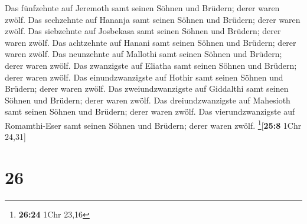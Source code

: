  Das fünfzehnte auf Jeremoth samt seinen Söhnen und
Brüdern; derer waren zwölf.  Das sechzehnte auf Hananja
samt seinen Söhnen und Brüdern; derer waren zwölf.  Das
siebzehnte auf Josbekasa samt seinen Söhnen und Brüdern; derer waren
zwölf.  Das achtzehnte auf Hanani samt seinen Söhnen und
Brüdern; derer waren zwölf.  Das neunzehnte auf Mallothi
samt seinen Söhnen und Brüdern; derer waren zwölf.  Das
zwanzigste auf Eliatha samt seinen Söhnen und Brüdern; derer waren
zwölf.  Das einundzwanzigste auf Hothir samt seinen
Söhnen und Brüdern; derer waren zwölf.  Das
zweiundzwanzigste auf Giddalthi samt seinen Söhnen und Brüdern; derer
waren zwölf.  Das dreiundzwanzigste auf Mahesioth samt
seinen Söhnen und Brüdern; derer waren zwölf.  Das
vierundzwanzigste auf Romamthi-Eser samt seinen Söhnen und Brüdern;
derer waren zwölf. \footnote{\textbf{26:24} 1Chr 23,16}{[}\textbf{25:8}
1Chr 24,31{]}

\hypertarget{section-25}{%
\section{26}\label{section-25}}

